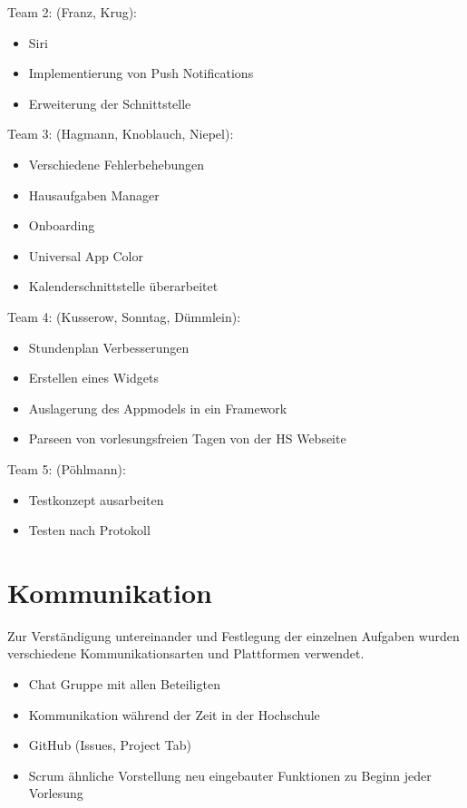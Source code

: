 Team 2: (Franz, Krug):
\begin{itemize}
\item Siri
\item Implementierung von Push Notifications
\item Erweiterung der Schnittstelle
\end{itemize}


Team 3: (Hagmann, Knoblauch, Niepel):
\begin{itemize}
\item Verschiedene Fehlerbehebungen
\item Hausaufgaben Manager
\item Onboarding 
\item Universal App Color
\item Kalenderschnittstelle überarbeitet
\end{itemize}


Team 4: (Kusserow, Sonntag, Dümmlein):
\begin{itemize}
\item Stundenplan Verbesserungen
\item Erstellen eines Widgets
\item Auslagerung des Appmodels in ein Framework
\item Parseen von vorlesungsfreien Tagen von der HS Webseite
\end{itemize}


Team 5: (Pöhlmann):
\begin{itemize}
\item Testkonzept ausarbeiten
\item Testen nach Protokoll
\end{itemize}

\newpage
\section{Kommunikation}
Zur Verständigung untereinander und Festlegung der einzelnen Aufgaben wurden verschiedene Kommunikationsarten und Plattformen verwendet.
\begin{itemize}
\item Chat Gruppe mit allen Beteiligten
\item Kommunikation während der Zeit in der Hochschule
\item GitHub (Issues, Project Tab)
\item Scrum ähnliche Vorstellung neu eingebauter Funktionen zu Beginn jeder Vorlesung
\end{itemize}



